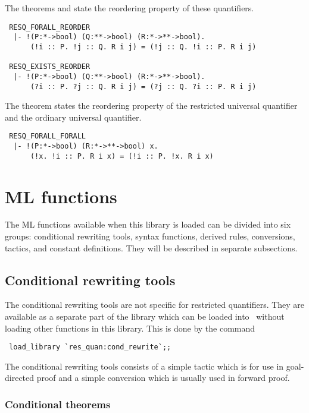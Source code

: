 The theorems  and 
state the reordering property of these quantifiers.
\begin{verbatim}
 RESQ_FORALL_REORDER
  |- !(P:*->bool) (Q:**->bool) (R:*->**->bool).
      (!i :: P. !j :: Q. R i j) = (!j :: Q. !i :: P. R i j)

 RESQ_EXISTS_REORDER
  |- !(P:*->bool) (Q:**->bool) (R:*->**->bool).
      (?i :: P. ?j :: Q. R i j) = (?j :: Q. ?i :: P. R i j)
\end{verbatim}
The theorem  states the reordering property of
the restricted universal quantifier and the ordinary universal
quantifier.
\begin{verbatim}
 RESQ_FORALL_FORALL
  |- !(P:*->bool) (R:*->**->bool) x.
      (!x. !i :: P. R i x) = (!i :: P. !x. R i x)
\end{verbatim}

\section{ML functions}

The ML functions available when this library is loaded can be divided
into six groups: conditional rewriting tools, syntax functions,
derived rules, conversions, tactics, and constant definitions. They
will be described in separate subsections.

\subsection{Conditional rewriting tools}

The conditional rewriting tools are not specific for restricted
quantifiers. They are available as a separate part of the library
which can be loaded into \HOL\ without loading other functions in this
library. This is done by the command
\begin{verbatim}
 load_library `res_quan:cond_rewrite`;;
\end{verbatim}

The conditional rewriting tools consists of a simple tactic which is
for use in goal-directed proof and a simple conversion which is
usually used in forward proof.

\subsubsection{Conditional theorems}

